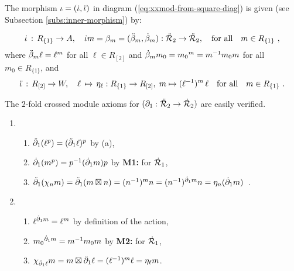 \begin{pf}
\bigskip
The morphism $\iota = (\dot{\iota}, \ddot{\iota})$ in diagram (\ref{eq:xxmod-from-square-diag})
is given (see Subsection \ref{subs:inner-morphism}) by:

$$
\dot{\iota} \,:\, R_{\{1\}} \to A, \quad
\dot{\iota} m = \beta_m = (\ddot{\beta}_m,\dot{\beta}_m) : \ddot{\mathcal{R}}_2 \to \ddot{\mathcal{R}}_2,
\quad\mbox{for all}\quad m \in R_{\{1\}}~,
$$
where\quad
$\ddot{\beta}_m \ell = \ell^m$ \quad
for all\quad 
$\ell \in R_{[2]}$\quad
and\quad
$\dot{\beta}_m m_0 = {m_0}^m = m^{-1}m_0m$\quad
for all\quad 
$m_0 \in R_{\{1\}}$, 
and
$$
\ddot{\iota} \,:\, R_{[2]} \to W, \quad 
\ell \,\mapsto\, \eta_{\ell} : R_{\{1\}} \to R_{[2]},\; 
m \mapsto (\ell^{-1})^m\,\ell \quad\mbox{for all}\quad m \in R_{\{1\}}~.
$$

\bigskip
The $2$-fold crossed module axioms for $(\partial_1 : \ddot{\mathcal{R}}_2 \to \dot{\mathcal{R}}_2)$ 
are easily verified.
\begin{enumerate}[{\bf CC1:}]
\item
\begin{enumerate}[{\rm (i)}]
\item
$\ddot{\partial}_1(\ell^p) = (\ddot{\partial}_1 \ell)^p$ by (a),
\item
$\dot{\partial}_1(m^p) = p^{-1}(\dot{\partial}_1 m)p$ by \textbf{M1:} for $\dot{\mathcal{R}}_1$,
\item
$\ddot{\partial}_1(\chi_n m) = \ddot{\partial}_1(m \boxtimes n) = (n^{-1})^mn 
                  = (n^{-1})^{\dot{\partial}_1 m}n = \eta_n(\dot{\partial}_1 m)$~.
\end{enumerate}
\item
\begin{enumerate}[{\rm (i)}]
\item
$\ell^{\dot{\partial}_1 m} = \ell^m$ by definition of the action,
\item
${m_0}^{\dot{\partial}_1 m} = m^{-1}m_0m$ by \textbf{M2:} for $\dot{\mathcal{R}}_1$,
\item
$\chi_{\ddot{\partial}_1\ell}m = m \boxtimes \ddot{\partial}_1\ell = (\ell^{-1})^m\ell = \eta_{\ell}m$. 
\end{enumerate}
\end{enumerate}
\end{pf}

\newpage

